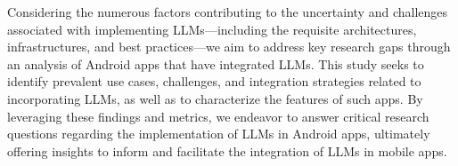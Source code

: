 



Considering the numerous factors contributing to the uncertainty and challenges associated with implementing LLMs—including the requisite architectures, infrastructures, and best practices—we aim to address key research gaps through an analysis of Android apps that have integrated LLMs. This study seeks to identify prevalent use cases, challenges, and integration strategies related to incorporating LLMs, as well as to characterize the features of such apps. By leveraging these findings and metrics, we endeavor to answer critical research questions regarding the implementation of LLMs in Android apps, ultimately offering insights to inform and facilitate the integration of LLMs in mobile apps.